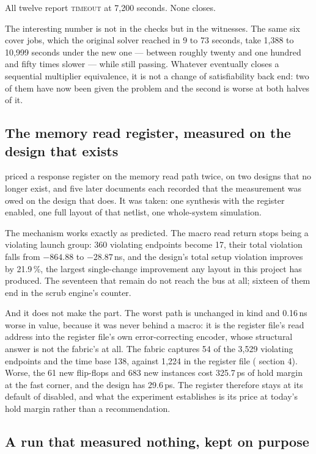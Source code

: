 All twelve report \textsc{timeout} at 7{,}200 seconds. None closes.

The interesting number is not in the checks but in the witnesses. The
same six cover jobs, which the original solver reached in 9 to 73
seconds, take 1{,}388 to 10{,}999 seconds under the new one --- between
roughly twenty and one hundred and fifty times slower --- while still
passing. Whatever eventually closes a sequential multiplier
equivalence, it is not a change of satisfiability back end: two of them
have now been given the problem and the second is worse at both halves
of it.

\subsection{The memory read register, measured on the design that
exists}
\label{sec:rdreg-result}

 priced a response register on the memory read path twice,
on two designs that no longer exist, and five later documents each
recorded that the measurement was owed on the design that does. It was
taken: one synthesis with the register enabled, one full layout of that
netlist, one whole-system simulation.

The mechanism works exactly as  predicted. The macro read
return stops being a violating launch group: 360 violating endpoints
become 17, their total violation falls from $-864.88$ to $-28.87$\,ns,
and the design's total setup violation improves by 21.9\,\%, the
largest single-change improvement any layout in this project has
produced. The seventeen that remain do not reach the bus at all;
sixteen of them end in the scrub engine's counter.

And it does not make the part. The worst path is unchanged in kind and
0.16\,ns worse in value, because it was never behind a macro: it is the
register file's read address into the register file's own error-correcting
encoder, whose structural answer is not the fabric's at all. The fabric
captures 54 of the 3{,}529 violating endpoints and the time base 138,
against 1{,}224 in the register file ( section 4). Worse, the 61 new
flip-flops and 683 new instances cost 325.7\,ps of hold margin at the
fast corner, and the design has 29.6\,ps. The register therefore stays
at its default of disabled, and what the experiment establishes is its
price at today's hold margin rather than a recommendation.

\subsection{A run that measured nothing, kept on purpose}

